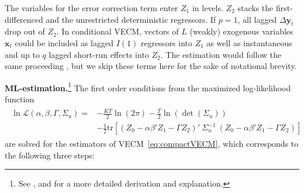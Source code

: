 The variables for the error correction term enter $ Z_1 $ in levels. $ Z_2 $ stacks the first-differenced and the unrestricted deterministic regressors. If $ p=1 $, all lagged $ \Delta \boldsymbol{y}_{t} $ drop out of $ Z_2 $. In conditional VECM, vectors of $ L $ (weakly) exogenous variables $ \boldsymbol{x}_t $ could be included as lagged $I(1)$ regressors into $ Z_1 $ as well as instantaneous and up to $ q $ lagged short-run effects into $ Z_2 $. The estimation would follow the same proceeding \citep[p.~398]{PesaranEtAl2000,Lutkepohl2005}, but we skip these terms here for the sake of notational brevity.


\textbf{ML-estimation.}\footnote{See \citet[Ch.~6]{Johansen1996}, \citet[Ch.~7.2.3]{Lutkepohl2005} and \citet[Ch.~3.1]{Lutkepohl2006} for a more detailed derivation and explanation.} The first order conditions from the maximized log-likelihood function
\begin{align} \label{eq:vecmLikeli}
\begin{split}
	\ln \mathcal{L} \left(\alpha, \beta, \Gamma, \Sigma_u \right) = & - \frac{KT}{2} \ln \left( 2\pi \right) - \frac{T}{2} \ln \left( \det ( \Sigma_u ) \right) \\
	& - \frac{1}{2} \text{tr} \left[ \left( Z_{0} - \alpha\beta' Z_{1} - \Gamma Z_{2} \right)' \ \Sigma_u^{-1} \ \left( Z_{0} - \alpha\beta' Z_{1} - \Gamma Z_{2} \right) \right]
\end{split}
\end{align} 
are solved for the estimators of VECM~\eqref{eq:compactVECM}, which corresponds to the following three steps:
